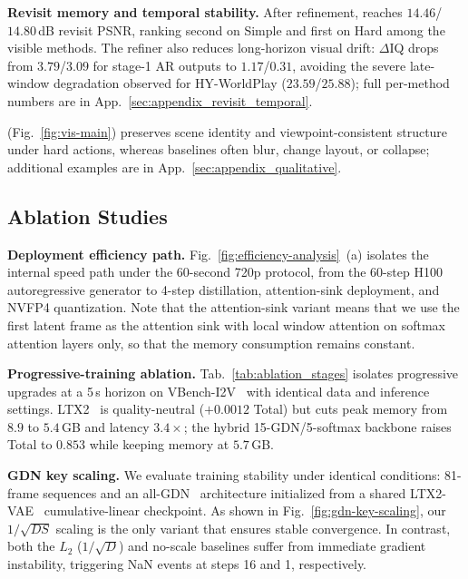 \noindent\textbf{Revisit memory and temporal stability.}
After refinement, \modelname reaches $14.46$/$14.80$\,dB revisit PSNR, ranking second on Simple and first on Hard among the visible methods.
The refiner also reduces long-horizon visual drift: $\Delta$IQ drops from $3.79$/$3.09$ for stage-1 AR outputs to $1.17$/$0.31$, avoiding the severe late-window degradation observed for HY-WorldPlay ($23.59$/$25.88$); full per-method numbers are in App.~\ref{sec:appendix_revisit_temporal}.



\noindent\modelname (Fig.~\ref{fig:vis-main}) preserves scene identity and viewpoint-consistent structure under hard actions, whereas baselines often blur, change layout, or collapse; additional examples are in App.~\ref{sec:appendix_qualitative}.



\subsection{Ablation Studies}
\label{sec:ablations}


\noindent\textbf{Deployment efficiency path.} %
Fig.~\ref{fig:efficiency-analysis}~(a) isolates the internal \modelname speed path under the 60-second 720p protocol, from the 60-step H100 autoregressive generator to 4-step distillation, attention-sink deployment, and NVFP4 quantization. Note that the attention-sink variant means that we use the first latent frame as the attention sink with local window attention on softmax attention layers only, so that the memory consumption remains constant.

\noindent\textbf{Progressive-training ablation.}
Tab.~\ref{tab:ablation_stages} isolates progressive upgrades at a 5\,s horizon on VBench-I2V~\citep{vbench} with identical data and inference settings. LTX2~\citep{ltx2} is quality-neutral ($+0.0012$ Total) but cuts peak memory from $8.9$ to $5.4$\,GB and latency $3.4{\times}$; the hybrid 15-GDN/5-softmax backbone raises Total to $0.853$ while keeping memory at $5.7$\,GB.





\noindent\textbf{GDN key scaling.}
We evaluate training stability under identical conditions: 81-frame sequences and an all-GDN~\citep{gated_deltanet} architecture initialized from a shared LTX2-VAE~\citep{ltx2} cumulative-linear checkpoint.
As shown in Fig.~\ref{fig:gdn-key-scaling}, our $1/\sqrt{D S}$ scaling is the only variant that ensures stable convergence.
In contrast, both the $L_2$ ($1/\sqrt{D}$) and no-scale baselines suffer from immediate gradient instability, triggering NaN events at steps 16 and 1, respectively.



